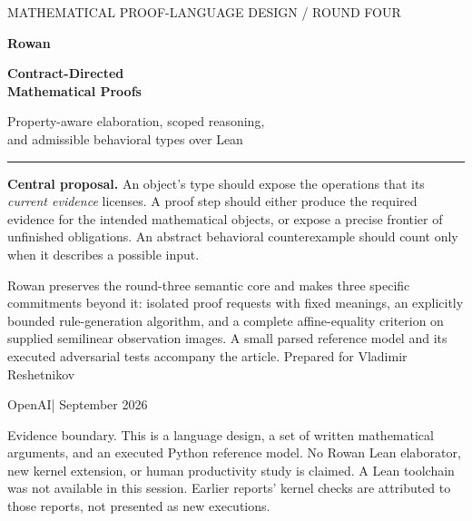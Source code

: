 \documentclass[11pt,letterpaper]{article}
\theoremstyle{definition}\newtheorem{definition}[theorem]{Definition}
\theoremstyle{remark}\newtheorem{remark}[theorem]{Remark}
\begin{document}
\hypersetup{pageanchor=false}
\begin{titlepage}
\vspace*{12mm}
{\sffamily\large\color{forest}MATHEMATICAL PROOF-LANGUAGE DESIGN / ROUND FOUR\par}
\vspace{18mm}
{\sffamily\bfseries\color{forest}\fontsize{48}{52}\selectfont Rowan\par}
\vspace{5mm}
{\sffamily\bfseries\color{ink}\fontsize{25}{30}\selectfont Contract-Directed\\Mathematical Proofs\par}
\vspace{8mm}
{\sffamily\Large Property-aware elaboration, scoped reasoning,\\and admissible behavioral types over Lean\par}
\vspace{13mm}
\hrule\vspace{5mm}
\textbf{Central proposal.} An object's type should expose the operations that
its \emph{current evidence} licenses. A proof step should either produce the
required evidence for the intended mathematical objects, or expose a precise
frontier of unfinished obligations. An abstract behavioral counterexample
should count only when it describes a possible input.
\vspace{7mm}

Rowan preserves the round-three semantic core and makes three specific
commitments beyond it: isolated proof requests with fixed meanings, an
explicitly bounded rule-generation algorithm, and a complete affine-equality
criterion on supplied semilinear observation images. A small parsed reference
model and its executed adversarial tests accompany the article.
\vfill
Prepared for Vladimir Reshetnikov\par
OpenAI\quad | September 2026\par
\vspace{5mm}
{\small\color{muted}Evidence boundary. This is a language design, a set of written
mathematical arguments, and an executed Python reference model. No Rowan Lean
elaborator, new kernel extension, or human productivity study is claimed.
A Lean toolchain was not available in this session. Earlier reports' kernel
checks are attributed to those reports, not presented as new executions.}
\end{titlepage}
\hypersetup{pageanchor=true}
\end{document}
